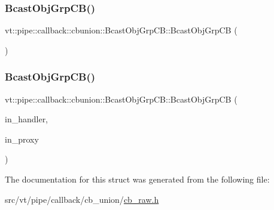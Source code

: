 \subsubsection{\texorpdfstring{Bcast\+Obj\+Grp\+C\+B()}{BcastObjGrpCB()}\hspace{0.1cm}{\footnotesize\ttfamily [1/2]}}
{\footnotesize\ttfamily vt\+::pipe\+::callback\+::cbunion\+::\+Bcast\+Obj\+Grp\+C\+B\+::\+Bcast\+Obj\+Grp\+CB (\begin{DoxyParamCaption}{ }\end{DoxyParamCaption})\hspace{0.3cm}{\ttfamily [default]}}

\mbox{\label{structvt_1_1pipe_1_1callback_1_1cbunion_1_1_bcast_obj_grp_c_b_acbeca55c248f5f9645300bac030610d2}} 
\subsubsection{\texorpdfstring{Bcast\+Obj\+Grp\+C\+B()}{BcastObjGrpCB()}\hspace{0.1cm}{\footnotesize\ttfamily [2/2]}}
{\footnotesize\ttfamily vt\+::pipe\+::callback\+::cbunion\+::\+Bcast\+Obj\+Grp\+C\+B\+::\+Bcast\+Obj\+Grp\+CB (\begin{DoxyParamCaption}\item[{\hyperlink{namespacevt_af64846b57dfcaf104da3ef6967917573}{Handler\+Type}}]{in\+\_\+handler,  }\item[{\hyperlink{namespacevt_ad7cae989df485fccca57f0792a880a8e}{Obj\+Group\+Proxy\+Type}}]{in\+\_\+proxy }\end{DoxyParamCaption})\hspace{0.3cm}{\ttfamily [inline]}}



The documentation for this struct was generated from the following file\+:\begin{DoxyCompactItemize}
\item 
src/vt/pipe/callback/cb\+\_\+union/\hyperlink{cb__raw_8h}{cb\+\_\+raw.\+h}\end{DoxyCompactItemize}
